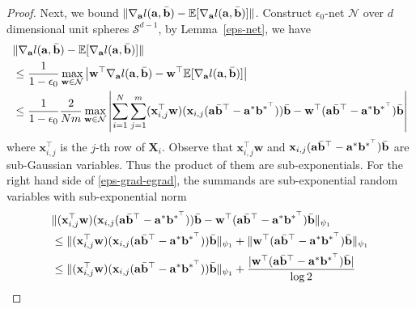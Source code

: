 \documentclass{article}
\theoremstyle{plain}
\theoremstyle{definition}
\theoremstyle{remark}
\begin{document}
\begin{proof}
Next, we bound $\lVert  \nabla_{\mathbf{a}}l(\mathbf{a},\Bar{\mathbf{b}})-\mathbb{E}[\nabla_{\mathbf{a}}l(\mathbf{a},\Bar{\mathbf{b}})]\rVert$. Construct $\epsilon_0$-net $\mathcal{N}$ over $d$ dimensional unit spheres $\mathcal{S}^{d-1}$, by Lemma~\ref{eps-net}, we have
\begin{align}
    &\lVert  \nabla_{\mathbf{a}}l(\mathbf{a},\Bar{\mathbf{b}})-\mathbb{E}[\nabla_{\mathbf{a}}l(\mathbf{a},\Bar{\mathbf{b}})]\rVert \\ &\leq \frac{1}{1-\epsilon_0} \max_{\mathbf{w}\in \mathcal{N}} \left|\mathbf{w}^\top\nabla_{\mathbf{a}}l(\mathbf{a},\Bar{\mathbf{b}})-\mathbf{w}^\top\mathbb{E}[\nabla_{\mathbf{a}}l(\mathbf{a},\Bar{\mathbf{b}})]\right| \label{grad-egrad-bound-with-w}\\
    & \le \frac{1}{1-\epsilon_0} \frac{2}{Nm}\max_{\mathbf{w}\in \mathcal{N}} \left| \sum_{i=1}^{N}\sum_{j=1}^{m}(\mathbf{x}_{i,j}^\top\mathbf{w})(\mathbf{x}_{i,j}(\mathbf{a}\Bar{\mathbf{b}}^\top-\mathbf{a}^* \mathbf{b}^{*^\top})) \Bar{\mathbf{b}} - \mathbf{w}^\top(\mathbf{a}\Bar{\mathbf{b}}^\top-\mathbf{a}^* \mathbf{b}^{*^\top}) \Bar{\mathbf{b}} \right| \label{eps-grad-egrad}
\end{align}
where $\mathbf{x}_{i,j}^\top$ is the $j$-th row of $\mathbf{X}_{i}$. Observe that $\mathbf{x}_{i,j}^\top\mathbf{w}$ and $\mathbf{x}_{i,j}(\mathbf{a}\Bar{\mathbf{b}}^\top-\mathbf{a}^* \mathbf{b}^{*^\top})\Bar{\mathbf{b}}$ are sub-Gaussian variables. Thus the product of them are sub-exponentials. For the right hand side of \eqref{eps-grad-egrad}, the summands are sub-exponential random variables with sub-exponential norm
\begin{align}
    &\| (\mathbf{x}_{i,j}^\top\mathbf{w})(\mathbf{x}_{i,j}(\mathbf{a}\Bar{\mathbf{b}}^\top-\mathbf{a}^* \mathbf{b}^{*^\top})) \Bar{\mathbf{b}} - \mathbf{w}^\top(\mathbf{a}\Bar{\mathbf{b}}^\top-\mathbf{a}^* \mathbf{b}^{*^\top}) \Bar{\mathbf{b}} \|_{\psi_1}\label{eq:bd2_psi1_1}\\
    &\leq \| (\mathbf{x}_{i,j}^\top\mathbf{w})(\mathbf{x}_{i,j}(\mathbf{a}\Bar{\mathbf{b}}^\top-\mathbf{a}^* \mathbf{b}^{*^\top})) \Bar{\mathbf{b}} \|_{\psi_1} + \| \mathbf{w}^\top(\mathbf{a}\Bar{\mathbf{b}}^\top-\mathbf{a}^* \mathbf{b}^{*^\top}) \Bar{\mathbf{b}}\|_{\psi_1}\label{eq:bd2_psi1_2}\\
    &\leq \| (\mathbf{x}_{i,j}^\top\mathbf{w})(\mathbf{x}_{i,j}(\mathbf{a}\Bar{\mathbf{b}}^\top-\mathbf{a}^* \mathbf{b}^{*^\top})) \Bar{\mathbf{b}} \|_{\psi_1} + \frac{| \mathbf{w}^\top(\mathbf{a}\Bar{\mathbf{b}}^\top-\mathbf{a}^* \mathbf{b}^{*^\top}) \Bar{\mathbf{b}}|}{\log 2}\label{eq:bd2_psi1_3}\\

\end{align}
\end{proof}
\end{document}
